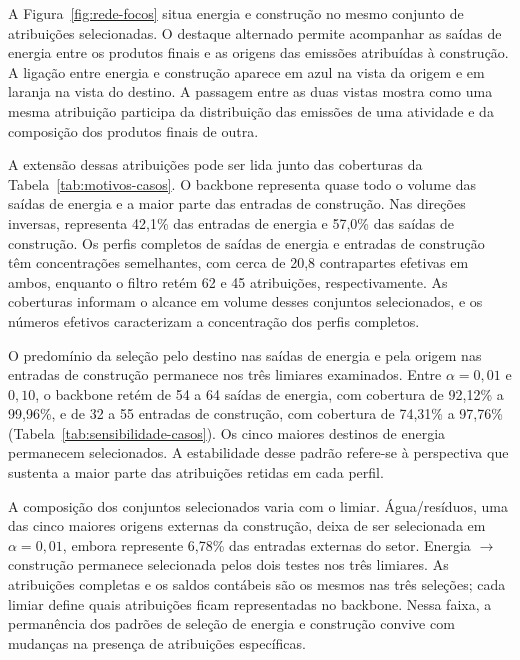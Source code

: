 A Figura~\ref{fig:rede-focos} situa energia e construção no mesmo conjunto de atribuições selecionadas. O destaque alternado permite acompanhar as saídas de energia entre os produtos finais e as origens das emissões atribuídas à construção. A ligação entre energia e construção aparece em azul na vista da origem e em laranja na vista do destino. A passagem entre as duas vistas mostra como uma mesma atribuição participa da distribuição das emissões de uma atividade e da composição dos produtos finais de outra.

A extensão dessas atribuições pode ser lida junto das coberturas da Tabela~\ref{tab:motivos-casos}. O backbone representa quase todo o volume das saídas de energia e a maior parte das entradas de construção. Nas direções inversas, representa 42,1\% das entradas de energia e 57,0\% das saídas de construção. Os perfis completos de saídas de energia e entradas de construção têm concentrações semelhantes, com cerca de 20,8 contrapartes efetivas em ambos, enquanto o filtro retém 62 e 45 atribuições, respectivamente. As coberturas informam o alcance em volume desses conjuntos selecionados, e os números efetivos caracterizam a concentração dos perfis completos.

O predomínio da seleção pelo destino nas saídas de energia e pela origem nas entradas de construção permanece nos três limiares examinados. Entre $\alpha=0{,}01$ e $0{,}10$, o backbone retém de 54 a 64 saídas de energia, com cobertura de 92,12\% a 99,96\%, e de 32 a 55 entradas de construção, com cobertura de 74,31\% a 97,76\% (Tabela~\ref{tab:sensibilidade-casos}). Os cinco maiores destinos de energia permanecem selecionados. A estabilidade desse padrão refere-se à perspectiva que sustenta a maior parte das atribuições retidas em cada perfil.

A composição dos conjuntos selecionados varia com o limiar. Água/resíduos, uma das cinco maiores origens externas da construção, deixa de ser selecionada em $\alpha=0{,}01$, embora represente 6,78\% das entradas externas do setor. Energia $\rightarrow$ construção permanece selecionada pelos dois testes nos três limiares. As atribuições completas e os saldos contábeis são os mesmos nas três seleções; cada limiar define quais atribuições ficam representadas no backbone. Nessa faixa, a permanência dos padrões de seleção de energia e construção convive com mudanças na presença de atribuições específicas.

